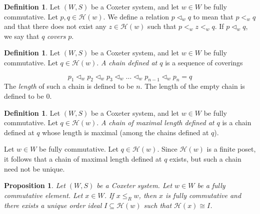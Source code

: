 \documentclass{amsart}
\theoremstyle{plain} %
\newtheorem{prop}[thm]{Proposition}
\theoremstyle{definition}
\newtheorem{defi}[thm]{Definition}
\def\weakr{\leq_{R}}
\def\H#1{\mathcal{H}(#1)}
\begin{document}
\begin{defi}
    Let $ (W,S)$ be a Coxeter system, and let $w\in W$ be fully commutative. Let $ p,q \in \H{w}$. We define a relation $ p \vartriangleleft_{w} q$ to mean that $ p <_{w} q$ and that there does not exist any $ z \in \H{w}$ such that $ p <_{w} z <_{w} q $. If $ p \vartriangleleft_{w} q$, we say that $ q$ \emph{covers} $ p$.
\end{defi}


\begin{defi}
    Let $ (W,S)$ be a Coxeter system, and let $w\in W$ be fully commutative. Let $ q \in \H{w}$. \emph{A chain defined at $ q$} is a sequence of coverings

    $$ p_{1} \vartriangleleft_{w} p_{2} \vartriangleleft_{w} p_{3} \vartriangleleft_{w} \dots \vartriangleleft_{w} p_{n-1} \vartriangleleft_{w}p_{n}  = q$$
    The \emph{length} of such a chain is defined to be $n$. The length of the empty chain is defined to be $0$.
\end{defi}

\begin{defi}
    Let $ (W,S)$ be a Coxeter system, and let $w\in W$ be fully commutative. Let $ q \in \H{w}$. \emph{A chain of maximal length defined at $q$} is a chain defined at $q$ whose length is maximal (among the chains defined at $q$).
\end{defi}
Let $ w\in W$ be fully commutative. Let $ q \in \H{w}$. Since $ \H{w}$ is a finite poset, it follows that a chain of maximal length defined at $q$ exists, but such a chain need not be unique.



\begin{prop} \label{uniqueidealprop}
    Let $ (W,S)$ be a Coxeter system. Let $ w\in W$ be a fully commutative element. Let $x\in W $. If $ x \weakr w$, then $x$ is fully commutative and there exists a \emph{unique} order ideal $I \subseteq \H{w}$ such that $ \H{x} \cong I$.
\end{prop}
\end{document}

